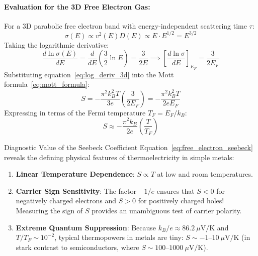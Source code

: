 \documentclass[11pt,a4paper]{article}
\begin{document}
\paragraph{Evaluation for the 3D Free Electron Gas:}
For a 3D parabolic free electron band with energy-independent scattering time $\tau$:
\begin{equation}
\sigma(E) \propto v^2(E) D(E) \propto E \cdot E^{1/2} = E^{3/2}
\end{equation}
Taking the logarithmic derivative:
\begin{equation}
\frac{d\ln\sigma(E)}{dE} = \frac{d}{dE}\left( \frac{3}{2}\ln E \right) = \frac{3}{2E} \implies \left[ \frac{d\ln\sigma}{dE} \right]_{E_F} = \frac{3}{2E_F}
\label{eq:log_deriv_3d}
\end{equation}
Substituting equation~\eqref{eq:log_deriv_3d} into the Mott formula~\eqref{eq:mott_formula}:
\begin{equation}
S = -\frac{\pi^2 k_B^2 T}{3e}\left( \frac{3}{2E_F} \right) = -\frac{\pi^2 k_B^2 T}{2e E_F}
\end{equation}
Expressing in terms of the Fermi temperature $T_F = E_F/k_B$:
\begin{equation}
\boxed{S \approx -\frac{\pi^2 k_B}{2e}\left(\frac{T}{T_F}\right)}
\label{eq:free_electron_seebeck}
\end{equation}

\begin{takeawaybox}{Diagnostic Value of the Seebeck Coefficient}
Equation~\eqref{eq:free_electron_seebeck} reveals the defining physical features of thermoelectricity in simple metals:
\begin{enumerate}
    \item \textbf{Linear Temperature Dependence}: $S \propto T$ at low and room temperatures.
    \item \textbf{Carrier Sign Sensitivity}: The factor $-1/e$ ensures that $S < 0$ for negatively charged electrons and $S > 0$ for positively charged holes! Measuring the sign of $S$ provides an unambiguous test of carrier polarity.
    \item \textbf{Extreme Quantum Suppression}: Because $k_B/e \approx 86.2\ \mu\mathrm{V/K}$ and $T/T_F \sim 10^{-2}$, typical thermopowers in metals are tiny: $S \sim -1\text{--}10\ \mu\mathrm{V/K}$ (in stark contrast to semiconductors, where $S \sim 100\text{--}1000\ \mu\mathrm{V/K}$).
\end{enumerate}
\end{takeawaybox}
\end{document}
